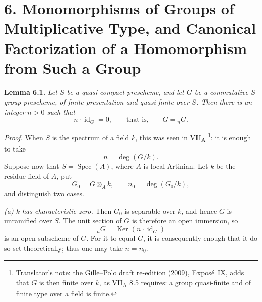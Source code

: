 

\section*{6. Monomorphisms of Groups of Multiplicative Type, and
Canonical Factorization of a Homomorphism from Such a Group}

\medskip
\noindent{}\textbf{Lemma 6.1.}
\textit{Let \(S\) be a quasi-compact prescheme, and let \(G\) be a
commutative \(S\)-group prescheme, of finite presentation and
quasi-finite over \(S\). Then there is an integer \(n>0\) such that
\[
  n\cdot\operatorname{id}_G=0,
  \qquad\text{that is,}\qquad
  G={}_nG.
\]}

\emph{Proof.}
When \(S\) is the spectrum of a field \(k\), this was seen in
VII\textsubscript{A} \footnote{Translator's note: the
Gille--Polo draft re-edition (2009), Expos\'e~IX, adds that \(G\) is then
finite over \(k\), as VII\textsubscript{A} 8.5 requires: a group quasi-finite
and of finite type over a field is finite.}: it is enough to take
\[
  n=\deg(G/k).
\]
Suppose now that \(S=\operatorname{Spec}(A)\), where \(A\) is local
Artinian. Let \(k\) be the residue field of \(A\), put
\[
  G_0=G\otimes_A k,
  \qquad
  n_0=\deg(G_0/k),
\]
and distinguish two cases.

\smallskip
{}\noindent\textit{(a) \(k\) has characteristic zero.}
Then \(G_0\) is separable over \(k\), and hence \(G\) is unramified over
\(S\). The unit section of \(G\) is therefore an open immersion, so
\[
  {}_nG=\operatorname{Ker}(n\cdot\operatorname{id}_G)
\]
is an open subscheme of \(G\). For it to equal \(G\), it is consequently
enough that it do so set-theoretically; thus one may take \(n=n_0\).

